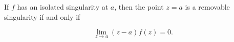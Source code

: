 If $f$ has an isolated singularity at $a$, then the point $z = a$ is a removable singularity if and only if

$$\lim_{z \to a} (z - a) f(z) = 0.$$
